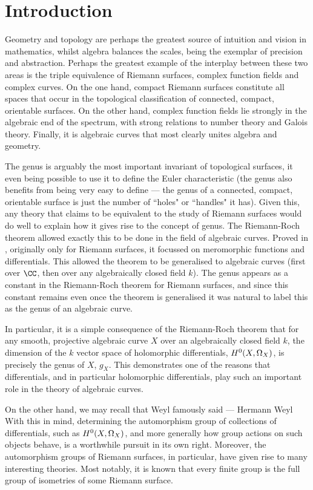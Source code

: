 \chapter{Introduction} \label{Chapter:introduction}


Geometry and topology are perhaps the greatest source of intuition and vision in mathematics, whilst algebra balances the scales, being the exemplar of precision and abstraction. 
Perhaps the greatest example of the interplay between these two areas is the triple equivalence of Riemann surfaces, complex function fields and complex curves.
On the one hand, compact Riemann surfaces constitute all spaces that occur in the topological classification of connected, compact, orientable surfaces.
On the other hand, complex function fields lie strongly in the algebraic end of the spectrum, with strong relations to number theory and Galois theory.
Finally, it is algebraic curves that most clearly unites algebra and geometry.

The genus is arguably the most important invariant of topological surfaces, it even being possible to use it to define the Euler characteristic (the genus also benefits from being very easy to define --- the genus of a connected, compact, orientable surface is just the number of ``holes" or ``handles" it has).
Given this, any theory that claims to be equivalent to the study of Riemann surfaces would do well to explain how it gives rise to the concept of genus.
The Riemann-Roch theorem allowed exactly this to be done in the field of algebraic curves.
Proved in , originally only for Riemann surfaces, it focussed on meromorphic functions and differentials.
This allowed the theorem to be generalised to algebraic curves (first over $\CC$, then over any algebraically closed field $k$).
The genus appears as a constant in the Riemann-Roch theorem for Riemann surfaces, and since this constant remains even once the theorem is generalised it was natural to label this as the genus of an algebraic curve.

In particular, it is a simple consequence of the Riemann-Roch theorem that for any smooth, projective algebraic curve $X$ over an algebraically closed field $k$, the dimension of the $k$ vector space of holomorphic differentials, ${H^0(X,\Omega_X)}$, is precisely the genus of $X$, $g_X$.
This demonstrates one of the reasons that differentials, and in particular holomorphic differentials, play such an important role in the theory of algebraic curves.

On the other hand, we may recall that Weyl famously said
{ --- Hermann Weyl}
With this in mind, determining the automorphism group of collections of differentials, such as ${H^0(X,\Omega_X)}$, and more generally how group actions on such objects behave, is a worthwhile pursuit in its own right.
Moreover, the automorphism groups of Riemann surfaces, in particular, have given rise to many interesting theories.
Most notably, it is known that every finite group is the full group of isometries of some Riemann surface.

